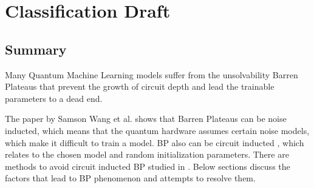 \section{Classification Draft}

\subsection{Summary}

Many Quantum Machine Learning models  suffer from the unsolvability Barren Plateaus \cite{zhaoReviewQuantumNeural2021} that prevent the growth of circuit depth and lead the trainable parameters to a dead end.

The paper \cite{wangNoiseinducedBarrenPlateaus2021} by Samson Wang et al. shows that Barren Plateaus can be noise inducted, which means that the quantum hardware assumes certain noise models, which make it difficult to train a model. 
BP also can be circuit inducted \cite{mccleanBarrenPlateausQuantum2018}, which relates to the chosen model and random initialization parameters.
There are methods to avoid circuit inducted BP studied in \cite{pesahAbsenceBarrenPlateaus2021, cerezoCostFunctionDependent2021,skolikLayerwiseLearningQuantum2021}.
Below sections discuss the factors that lead to BP phenomenon and attempts to resolve them.







